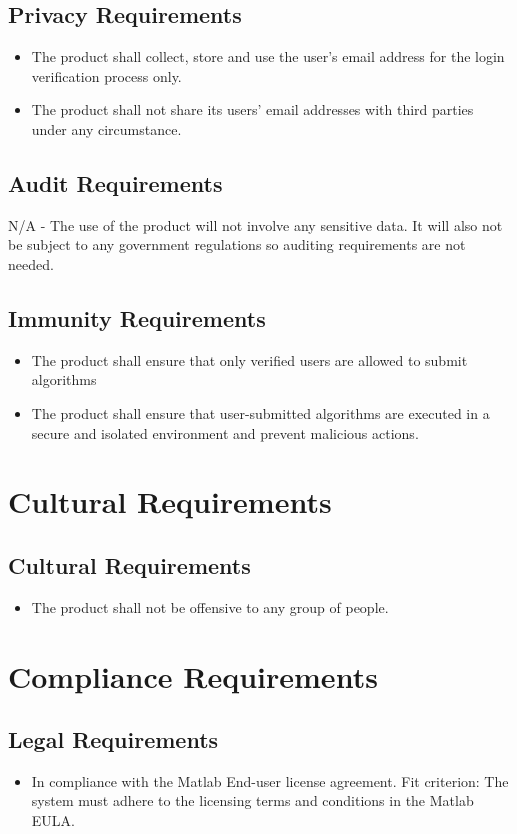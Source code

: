 \documentclass[12pt]{article}
\begin{document}
\subsection{Privacy Requirements}
\begin{itemize}
    \item The product shall collect, store and use the user’s email address for the login verification process only.
    \item The product shall not share its users’ email addresses with third parties under any circumstance. 
\end{itemize}
\subsection{Audit Requirements}
N/A - The use of the product will not involve any sensitive data. It will also not be subject to any government regulations so auditing requirements are not needed.

\subsection{Immunity Requirements}
\begin{itemize}
    \item The product shall ensure that only verified users are allowed to submit algorithms
    \item The product shall ensure that user-submitted algorithms are executed in a secure and isolated environment and prevent malicious actions.
\end{itemize}

\section{Cultural Requirements}
\subsection{Cultural Requirements}
\begin{itemize}
    \item The product shall not be offensive to any group of people.
\end{itemize}

\section{Compliance Requirements}
\subsection{Legal Requirements}
\begin{itemize}
    \item In compliance with the Matlab End-user license agreement. \hfill \break
    Fit criterion: The system must adhere to the licensing terms and conditions in the Matlab EULA.

\end{itemize}
\end{document}
